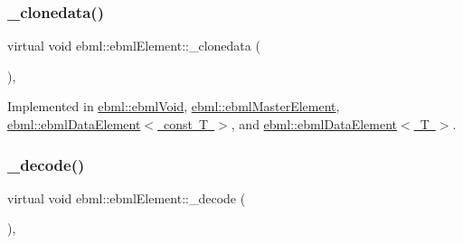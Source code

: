 \mbox{\label{classebml_1_1ebmlElement_a3ebe3aa75b62971f385c01f27c807a02}} 
\subsubsection{\texorpdfstring{\+\_\+clonedata()}{\_clonedata()}}
{\footnotesize\ttfamily virtual void ebml\+::ebml\+Element\+::\+\_\+clonedata (\begin{DoxyParamCaption}\item[{const \mbox{\hyperlink{classebml_1_1ebmlElement}{ebml\+Element}} $\ast$}]{ }\end{DoxyParamCaption})\hspace{0.3cm}{\ttfamily [protected]}, {}}



Implemented in \mbox{\hyperlink{classebml_1_1ebmlVoid_a1319a15cbec91a7f52763c30d7fa3a18}{ebml\+::ebml\+Void}}, \mbox{\hyperlink{classebml_1_1ebmlMasterElement_a9bde42f70ab39592c4dccb6bf04904d4}{ebml\+::ebml\+Master\+Element}}, \mbox{\hyperlink{classebml_1_1ebmlDataElement_3_01const_01T_01_4_a46a152b21a6fc49a331e61f29c486ebe}{ebml\+::ebml\+Data\+Element$<$ const T $>$}}, and \mbox{\hyperlink{classebml_1_1ebmlDataElement_abc9e99cdc566a08b2334e55374dc5f5a}{ebml\+::ebml\+Data\+Element$<$ T $>$}}.

\mbox{\label{classebml_1_1ebmlElement_af7852c01970bf937f6787eac4843bdbd}} 
\subsubsection{\texorpdfstring{\+\_\+decode()}{\_decode()}\hspace{0.1cm}{\footnotesize\ttfamily [1/2]}}
{\footnotesize\ttfamily virtual void ebml\+::ebml\+Element\+::\+\_\+decode (\begin{DoxyParamCaption}\item[{const \mbox{\hyperlink{classebml_1_1parseString}{parse\+String}} \&}]{ }\end{DoxyParamCaption})\hspace{0.3cm}{\ttfamily [protected]}, {}}



